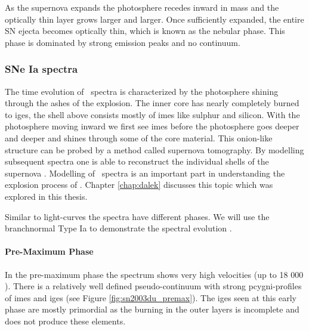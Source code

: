 As the supernova expands the photosphere recedes inward in mass and the optically thin layer grows larger and larger. Once sufficiently expanded, the entire SN ejecta becomes optically thin, which is known as the nebular phase. This phase is dominated by strong emission peaks and no continuum. 


\subsubsection{SNe Ia spectra}
\label{sec:intro_sneia_spectra}
The time evolution of \sneia\ spectra is characterized by the photosphere shining through the ashes of the explosion. The inner core has nearly completely burned to \glspl{ige}, the shell above consists mostly of \glspl{ime} like sulphur and silicon. With the photosphere moving inward we first see \glspl{ime} before the photosphere goes deeper and deeper and shines through some of the core material. This onion-like structure can be probed by a method called supernova tomography. By modelling subsequent spectra one is able to reconstruct the individual shells of the supernova \citep{2005MNRAS.360.1231S, 2009MNRAS.399.1238H}. 
Modelling of \sneia\ spectra is an important part in understanding the explosion process of \sneia. Chapter \ref{chap:dalek} discusses this topic which was explored in this thesis.

Similar to light-curves the spectra have different phases. We will use the \gls{branchnormal} Type Ia  to demonstrate the spectral evolution \citep[][]{2011MNRAS.410.1725T}. 

\paragraph{Pre-Maximum Phase}
In the pre-maximum phase the spectrum shows very high velocities (up to 18 000 \kms). There is a relatively well defined pseudo-continuum with strong \gls{pcygni}-profiles of \glspl{ime} and \glspl{ige} (see Figure \ref{fig:sn2003du_premax}). The \glspl{ige} seen at this early phase are mostly primordial as the burning in the outer layers  is incomplete and does not produce these elements. 


